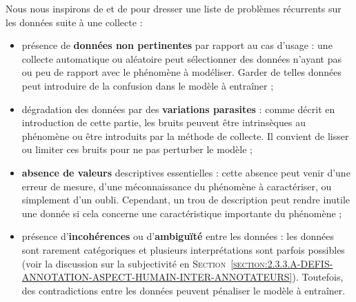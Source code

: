 			Nous nous inspirons de \cite{maharana-etal:2022:review-data-preprocessing} et de \cite{alasadi-bhaya:2017:review-data-preprocessing} pour dresser une liste de problèmes récurrents sur les données suite à une collecte :
			\begin{itemize}
				\item présence de \textbf{données non pertinentes} par rapport au cas d'usage :
				une collecte automatique ou aléatoire peut sélectionner des données n'ayant pas ou peu de rapport avec le phénomène à modéliser.
				Garder de telles données peut introduire de la confusion dans le modèle à entraîner ;
				\item dégradation des données par des \textbf{variations parasites} :
				comme décrit en introduction de cette partie, les bruits peuvent être intrinsèques au phénomène ou être introduits par la méthode de collecte.
				Il convient de lisser ou limiter ces bruits pour ne pas perturber le modèle ;
				\item \textbf{absence de valeurs} descriptives essentielles :
				cette absence peut venir d'une erreur de mesure, d'une méconnaissance du phénomène à caractériser, ou simplement d'un oubli.
				Cependant, un trou de description peut rendre inutile une donnée si cela concerne une caractéristique importante du phénomène ;
				\item présence d'\textbf{incohérences} ou d'\textbf{ambiguïté} entre les données :
				les données sont rarement catégoriques et plusieurs interprétations sont parfois possibles (voir la discussion sur la subjectivité en \textsc{Section~\ref{section:2.3.3.A-DEFIS-ANNOTATION-ASPECT-HUMAIN-INTER-ANNOTATEURS}}).
				Toutefois, des contradictions entre les données peuvent pénaliser le modèle à entraîner.
			\end{itemize}
